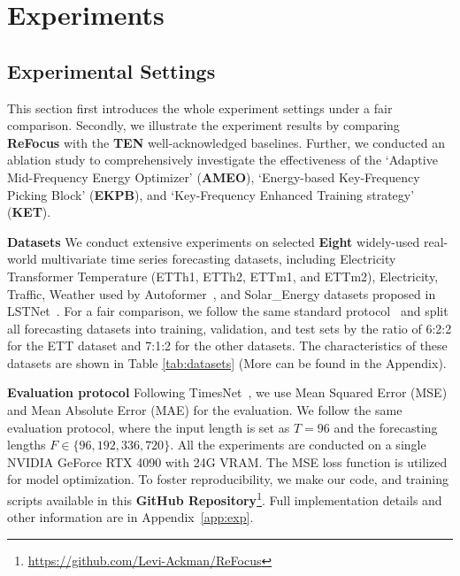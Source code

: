 \section{Experiments}
\subsection{Experimental Settings}
This section first introduces the whole experiment settings under a fair comparison.
Secondly, we illustrate the experiment results by comparing \textbf{ReFocus} with the \textbf{TEN} well-acknowledged baselines.
Further, we conducted an ablation study to comprehensively investigate the effectiveness of the `Adaptive Mid-Frequency Energy Optimizer' (\textbf{AMEO}), `Energy-based Key-Frequency Picking Block' (\textbf{EKPB}), and `Key-Frequency Enhanced Training strategy' (\textbf{KET}).


\textbf{Datasets \quad} We conduct extensive experiments on selected \textbf{Eight} widely-used real-world multivariate time series forecasting datasets, including Electricity Transformer Temperature (ETTh1, ETTh2, ETTm1, and ETTm2), Electricity, Traffic, Weather used by Autoformer~\citep{Wu2021autoformer}, and Solar\_Energy datasets proposed in LSTNet~\citep{Lai2018lstnet}.
For a fair comparison, we follow the same standard protocol~\citep{LiuiTransformer} and split all forecasting datasets into training, validation, and test sets by the ratio of 6:2:2 for the ETT dataset and 7:1:2 for the other datasets. The characteristics of these datasets are shown in Table \ref{tab:datasets} (More can be found in the Appendix). 

\textbf{Evaluation protocol \quad} Following TimesNet~\citep{wu2022timesnet}, we use Mean Squared Error (MSE) and Mean Absolute Error (MAE) for the evaluation. We follow the same evaluation protocol, where the input length is set as $T=96$ and the forecasting lengths $F \in \{96, 192, 336, 720\}$. All the experiments are conducted on a single NVIDIA GeForce RTX 4090
with 24G VRAM. The MSE loss function is utilized for model optimization. To foster reproducibility, we make our code, and training scripts available in this \textbf{GitHub Repository}\footnote{\url{https://github.com/Levi-Ackman/ReFocus}}. Full implementation details and other information are in Appendix~\ref{app:exp}.

